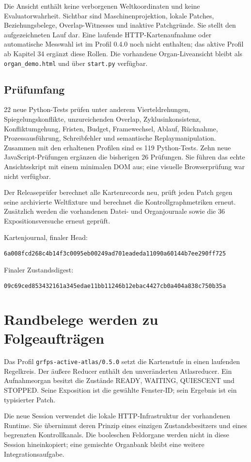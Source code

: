 \documentclass[11pt,a4paper]{article}
\newcommand{\nextsection}[2]{\clearpage{\color{accent}\small\textsf{#1}}\section{#2}}
\begin{document}
Die Ansicht enthält keine verborgenen Weltkoordinaten und keine
Evaluatorwahrheit. Sichtbar sind Maschinenprojektion, lokale Patches,
Beziehungsbelege, Overlap-Witnesses und inaktive Patchgründe. Sie
stellt den aufgezeichneten Lauf dar. Eine laufende HTTP-Kartenaufnahme
oder automatische Messwahl ist im Profil 0.4.0 noch nicht enthalten;
das aktive Profil ab Kapitel 34 ergänzt diese Rollen.
Die vorhandene Organ-Liveansicht bleibt als \texttt{organ\_demo.html}
und über \texttt{start.py} verfügbar.

\subsection{Prüfumfang}
22 neue Python-Tests prüfen unter anderem Vierteldrehungen,
Spiegelungskonflikte, unzureichenden Overlap, Zyklusinkonsistenz,
Konfliktumgehung, Fristen, Budget, Framewechsel, Ablauf,
Rücknahme, Prozessausführung, Schreibfehler und semantische
Replaymanipulation. Zusammen mit den erhaltenen Profilen sind es
119 Python-Tests. Zehn neue JavaScript-Prüfungen ergänzen die
bisherigen 26 Prüfungen. Sie führen das echte Ansichtsskript mit
einem minimalen DOM aus; eine visuelle Browserprüfung war nicht verfügbar.

Der Releaseprüfer berechnet alle Kartenrecords neu, prüft jeden
Patch gegen seine archivierte Weltfixture und berechnet die
Kontrollgraphmetriken erneut. Zusätzlich werden die vorhandenen
Datei- und Organjournale sowie die 36 Expositionsversuche erneut geprüft.

Kartenjournal, finaler Head:
\begin{lstlisting}
6a008fcd268c4b14f3c0095eb00249ad701eadeda11090a60144b7ee290ff725
\end{lstlisting}
Finaler Zustandsdigest:
\begin{lstlisting}
09c69ced853432161a345edae11bb11246b12ebac4427cb0a404a838c750b35a
\end{lstlisting}

\nextsection{34 / AKTIVES FENSTERORGAN}{Randbelege werden zu Folgeaufträgen}
Das Profil \texttt{grfps-active-atlas/0.5.0} setzt die Kartenstufe
in einen laufenden Regelkreis. Der äußere Reducer enthält den
unveränderten Atlasreducer. Ein Aufnahmeorgan besitzt die Zustände
READY, WAITING, QUIESCENT und STOPPED. Seine Exposition ist die
gewählte Fenster-ID; sein Ergebnis ist ein typisierter Patch.

Die neue Session verwendet die lokale HTTP-Infrastruktur der
vorhandenen Runtime. Sie übernimmt deren Prinzip eines einzigen
Zustandsbesitzers und eines begrenzten Kontrollkanals. Die
booleschen Feldorgane werden nicht in diese Session hineinkopiert;
eine gemischte Organbank bleibt eine weitere Integrationsaufgabe.
\end{document}
